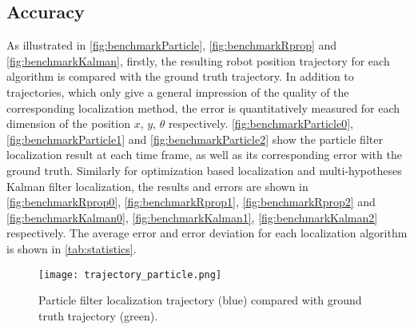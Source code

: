 \subsection{Accuracy}
\label{sub:Accuracy}
As illustrated in \autoref{fig:benchmarkParticle}, \autoref{fig:benchmarkRprop} and \autoref{fig:benchmarkKalman}, firstly, the resulting robot position trajectory for each algorithm is compared with the ground truth trajectory. In addition to trajectories, which only give a general impression of the quality of the corresponding localization method, the error is quantitatively measured for each dimension of the position $x$, $y$, $\theta$ respectively. 
\autoref{fig:benchmarkParticle0},  \autoref{fig:benchmarkParticle1} and \autoref{fig:benchmarkParticle2} show the particle filter localization result at each time frame, as well as its corresponding error with the ground truth. Similarly for optimization based localization and multi-hypotheses Kalman filter localization,  the results and errors are shown in \autoref{fig:benchmarkRprop0},  \autoref{fig:benchmarkRprop1}, \autoref{fig:benchmarkRprop2} and \autoref{fig:benchmarkKalman0},  \autoref{fig:benchmarkKalman1}, \autoref{fig:benchmarkKalman2} respectively. The average error and error deviation for each localization algorithm is shown in \autoref{tab:statistics}.




% 

\begin{figure}[!htbp]
\begin{center}
 	\texttt{[image: trajectory\_particle.png]}
\end{center}
\caption[Particle filter localization trajectory compared with ground truth trajectory.]{Particle filter localization trajectory (blue) compared with ground truth trajectory (green).}
\label{fig:benchmarkParticle}
\end{figure}

